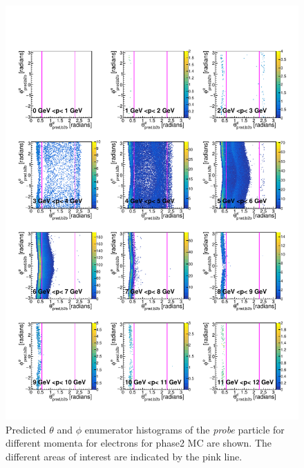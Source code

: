 \documentclass[a4paper,11pt,twosided,final,german,openbib,pdftex,listof=totoc,bibliography=totoc]{scrbook}
\begin{document}
\begin{appendix}
\begin{figure}[h!]
	\includegraphics[width=\textwidth]{Plots/master/RTPMemE_MC.pdf}
	\caption[Enumerator $\theta$-$\phi$ Electron Momentum Phase2 MC]{Predicted $\theta$ and $\phi$ enumerator histograms of the \textit{probe} particle for different momenta for electrons for phase2 MC are shown. The different areas of interest are indicated by the pink line.}
	\label{plt:RTPMemE_MC}
\end{figure}


\end{appendix}
\end{document}
